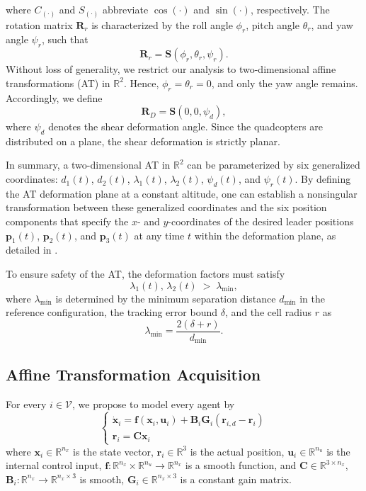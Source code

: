 \documentclass[journal]{IEEEtran}
\theoremstyle{definition}
\theoremstyle{plain}
\begin{document}
where $C_{\left(\cdot\right)}$ and $S_{\left(\cdot\right)}$ abbreviate $\cos{\left(\cdot\right)}$ and $\sin{\left(\cdot\right)}$, respectively.  The rotation matrix $\mathbf{R}_r$ is characterized by the roll angle $\phi_r$, pitch angle $\theta_r$, and yaw angle $\psi_r$, such that
\begin{equation}
\mathbf{R}_r = \mathbf{S}\left(\phi_r,\theta_r,\psi_r\right).
\end{equation}
Without loss of generality, we restrict our analysis to two-dimensional affine transformations (AT) in $\mathbb{R}^2$. Hence, $\phi_r = \theta_r = 0$, and only the yaw angle remains. Accordingly, we define
\begin{equation}
\mathbf{R}_D = \mathbf{S}\left(0,0,\psi_d\right),
\end{equation}
where $\psi_d$ denotes the shear deformation angle. Since the quadcopters are distributed on a plane, the shear deformation is strictly planar.

In summary, a two-dimensional AT in $\mathbb{R}^2$ can be parameterized by six generalized coordinates: $d_1(t)$, $d_2(t)$,  $\lambda_1(t)$, $\lambda_2(t)$, $\psi_d(t)$, and $\psi_r(t)$. By defining the AT deformation plane at a constant altitude, one can establish a nonsingular transformation between these generalized coordinates and the six position components that specify the $x$- and $y$-coordinates of the desired leader positions $\mathbf{p}_1(t)$, $\mathbf{p}_2(t)$, and $\mathbf{p}_3(t)$ at any time $t$ within the deformation plane, as detailed in \cite{rastgoftar2021scalable}.


 
To ensure safety of the AT, the deformation factors must satisfy 
\[
\lambda_1(t),\,\lambda_2(t) \;>\; \lambda_{\min},
\]
where $\lambda_{\min}$ is determined by the minimum separation distance $d_{\min}$ in the reference configuration, the tracking error bound $\delta$, and the cell radius $r$ as
\[
\lambda_{\min}=\frac{2(\delta+r)}{d_{\min}}.
\]

\subsection{Affine Transformation Acquisition}\label{Affine Transformation Acquisition}
For every $i\in \mathcal{V}$, we propose to model every agent by  
\begin{equation}\label{nonldyn}
\begin{cases}    \dot{\mathbf{x}}_i=\mathbf{f}\left(\mathbf{x}_i,\mathbf{u}_i\right)+\mathbf{B}_i\mathbf{G}_i\left(\mathbf{r}_{i,d}-\mathbf{r}_i\right)\\
\mathbf{r}_i=\mathbf{C}\mathbf{x}_i
\end{cases}    
\end{equation}
where $\mathbf{x}_i\in \mathbb{R}^{n_x}$ is the state vector, $\mathbf{r}_i\in \mathbb{R}^{3}$ is the actual position, $\mathbf{u}_i\in \mathbb{R}^{n_u}$ is the internal control input,  $\mathbf{f}:\mathbb{R}^{n_x}\times \mathbb{R}^{n_u}\rightarrow \mathbb{R}^{n_x}$ is a smooth function, and $\mathbf{C}\in \mathbb{R}^{3\times n_x}$, $\mathbf{B}_i: \mathbb{R}^{n_x}\rightarrow \mathbb{R}^{n_x\times 3}$ is smooth, $\mathbf{G}_i\in \mathbb{R}^{n_x \times 3}$ is a constant gain matrix.
\end{document}
